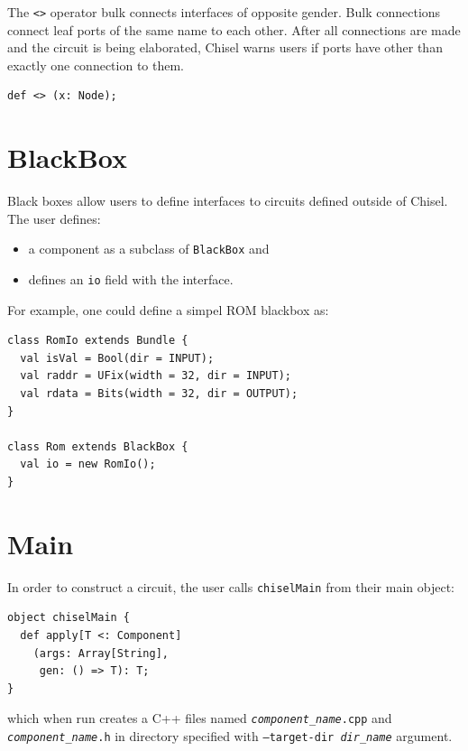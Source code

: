 \documentclass[10pt,twocolumn]{article}
\def\code#1{{\small\tt #1}}
\begin{document}
The \code{<>} operator bulk connects interfaces of opposite gender.
Bulk connections connect leaf ports of the same name to each other.
After all connections are made and the circuit is being elaborated,
Chisel warns users if ports have other than exactly one connection to them.

\begin{lstlisting}
def <> (x: Node);
\end{lstlisting}


\section{BlackBox}

Black boxes allow users to define interfaces to circuits defined
outside of Chisel.  The user defines:

\begin{itemize}
\item a component as a subclass of \code{BlackBox} and
\item defines an \code{io} field with the interface.
\end{itemize}

\noindent
For example, one could define a simpel ROM blackbox as:

\begin{lstlisting}
class RomIo extends Bundle {
  val isVal = Bool(dir = INPUT);
  val raddr = UFix(width = 32, dir = INPUT);
  val rdata = Bits(width = 32, dir = OUTPUT);
}

class Rom extends BlackBox {
  val io = new RomIo();
}
\end{lstlisting}

\section{Main}

In order to construct a circuit, 
the user calls \code{chiselMain} from their main object:

\begin{lstlisting}
object chiselMain {
  def apply[T <: Component]
    (args: Array[String], 
     gen: () => T): T;
}
\end{lstlisting}

\noindent
which when run creates a C++ files named
\code{{\it component\_name}.cpp} and \code{{\it component\_name}.h} in directory specified with
\code{--target-dir {\it dir\_name}} argument.
\end{document}
